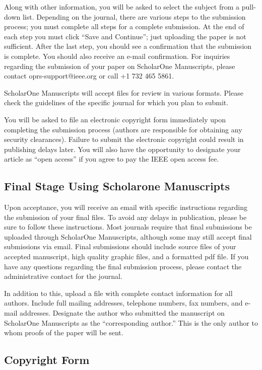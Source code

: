 \documentclass[journal]{IEEEtai}
\begin{document}
Along with other information, you will be asked to select the subject from a pull-down list. Depending on the journal, there are various steps to the submission process; you must complete all steps for a complete submission. At the end of each step you must click ``Save and Continue''; just uploading the paper is not sufficient. After the last step, you should see a confirmation that the submission is complete. You should also receive an e-mail confirmation. For inquiries regarding the submission of your paper on ScholarOne Manuscripts, please contact oprs-support@ieee.org or call +1 732 465 5861.

ScholarOne Manuscripts will accept files for review in various formats. Please check the guidelines of the specific journal for which you plan to submit. 

You will be asked to file an electronic copyright form immediately upon completing the submission process (authors are responsible for obtaining any security clearances). Failure to submit the electronic copyright could result in publishing delays later. You will also have the opportunity to designate your article as ``open access'' if you agree to pay the IEEE open access fee. 

\subsection{Final Stage Using Scholarone Manuscripts}

Upon acceptance, you will receive an email with specific instructions regarding the submission of your final files. To avoid any delays in publication, please be sure to follow these instructions. Most journals require that final submissions be uploaded through ScholarOne Manuscripts, although some may still accept final submissions via email. Final submissions should include source files of your accepted manuscript, high quality graphic files, and a formatted pdf file. If you have any questions regarding the final submission process, please contact the administrative contact for the journal. 

In addition to this, upload a file with complete contact information for all authors. Include full mailing addresses, telephone numbers, fax numbers, and e-mail addresses. Designate the author who submitted the manuscript on ScholarOne Manuscripts as the ``corresponding author.'' This is the only author to whom proofs of the paper will be sent. 

\subsection{Copyright Form}
\end{document}
